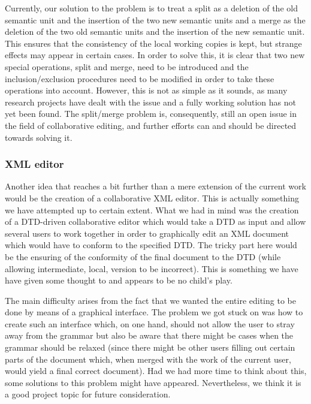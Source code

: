 Currently, our solution to the problem is to treat a split as a deletion of the old semantic
unit and the insertion of the two new semantic units and a merge as the deletion of the two
old semantic units and the insertion of the new semantic unit. This ensures that the consistency
of the local working copies is kept, but strange effects may appear in certain cases. In
order to solve this, it is clear that two new special operations, split and merge, need to be
introduced and the inclusion/exclusion procedures need to be modified in order to take these operations
into account. However, this is not as simple as it sounds, as many research projects have dealt
with the issue and a fully working solution has not yet been found. The split/merge problem is,
consequently, still an open issue in the field of collaborative editing, and further efforts
can and should be directed towards solving it.

\subsubsection{XML editor}

Another idea that reaches a bit further than a mere extension of the current work would be
the creation of a collaborative XML editor. This is actually something we have attempted up
to certain extent. What we had in mind was the creation of a DTD-driven collaborative editor
which would take a DTD as input and allow several users to work together in order to graphically
edit an XML document which would have to conform to the specified DTD. The tricky part
here would be the ensuring of the conformity of the final document to the DTD (while allowing
intermediate, local, version to be incorrect). This is something we have have given some thought
to and appears to be no child's play.

The main difficulty arises from the fact that we wanted the entire editing to be done by means
of a graphical interface. The problem we got stuck on was how to create such an interface which,
on one hand, should not allow the user to stray away from the grammar but also be aware that
there might be cases when the grammar should be relaxed (since there might be other users
filling out certain parts of the document which, when merged with the work of the current user,
would yield a final correct document). Had we had more time to think about this, some solutions
to this problem might have appeared. Nevertheless, we think it is a good project topic for
future consideration.

